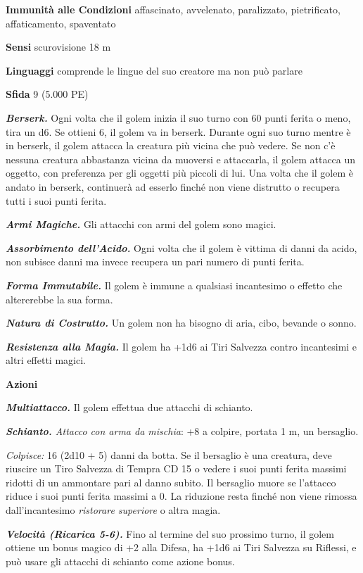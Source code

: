 \begin{multicols}{2}
\textbf{Immunità alle Condizioni} affascinato, avvelenato, paralizzato, pietrificato, affaticamento, spaventato

\textbf{Sensi} scurovisione 18 m

\textbf{Linguaggi} comprende le lingue del suo creatore ma non può parlare

\textbf{Sfida} 9 (5.000 PE)

\emph{\textbf{Berserk.}} Ogni volta che il golem inizia il suo turno con 60 punti ferita o meno, tira un d6. Se ottieni 6, il golem va in berserk. Durante ogni suo turno mentre è in berserk, il golem attacca la creatura più vicina che può vedere. Se non c'è nessuna creatura abbastanza vicina da muoversi e attaccarla, il golem attacca un oggetto, con preferenza per gli oggetti più piccoli di lui. Una volta che il golem è andato in berserk, continuerà ad esserlo finché non viene distrutto o recupera tutti i suoi punti ferita.

\emph{\textbf{Armi Magiche.}} Gli attacchi con armi del golem sono magici.

\emph{\textbf{Assorbimento dell'Acido.}} Ogni volta che il golem è vittima di danni da acido, non subisce danni ma invece recupera un pari numero di punti ferita. 

\emph{\textbf{Forma Immutabile.}} Il golem è immune a qualsiasi incantesimo o effetto che altererebbe la sua forma.

\emph{\textbf{Natura di Costrutto.}} Un golem non ha bisogno di aria, cibo, bevande o sonno.

\emph{\textbf{Resistenza alla Magia.}} Il golem ha +1d6 ai Tiri Salvezza contro incantesimi e altri effetti magici.

\textbf{Azioni}

\emph{\textbf{Multiattacco.}} Il golem effettua due attacchi di schianto.

\emph{\textbf{Schianto.} Attacco con arma da mischia}: +8 a colpire, portata 1 m, un bersaglio.

\emph{Colpisce:} 16 (2d10 + 5) danni da botta. Se il bersaglio è una creatura, deve riuscire un Tiro Salvezza di Tempra CD 15 o vedere i suoi punti ferita massimi ridotti di un ammontare pari al danno subito. Il bersaglio muore se l'attacco riduce i suoi punti ferita massimi a 0. La riduzione resta finché non viene rimossa dall'incantesimo \emph{ristorare superiore} o altra magia.

\emph{\textbf{Velocità (Ricarica 5-6).}} Fino al termine del suo prossimo turno, il golem ottiene un bonus magico di +2 alla Difesa, ha +1d6 ai Tiri Salvezza su Riflessi, e può usare gli attacchi di schianto come azione bonus.


\end{multicols}
